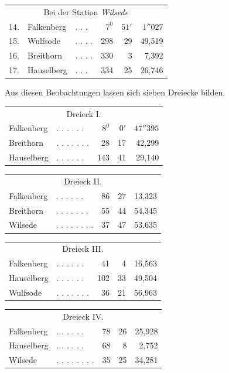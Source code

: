 \begin{center}
\begin{tabular}{r l l r r r}
\multicolumn{6}{c}{Bei der Station \textit{Wilsede}}\\[5pt]
14.&Falkenberg&. . .&\(7^0\)&\(51'\)&\(1''027\)\\
15.&Wulfsode&. . . .&298&29&49,519\\
16.&Breithorn&. . . .&330&3&7,392\\
17.&Hauselberg&. . .&334&25&26,746
\end{tabular}
\end{center}

Aus diesen Beobachtungen lassen sich sieben Dreiecke bilden.
\begin{center}
\begin{tabular}{l l r r r}
\multicolumn{5}{c}{Dreieck I.}\\[5pt]
Falkenberg&. . . . . .&\(8^0\)&\(0'\)&\(47''395\)\\
Breithorn&. . . . . . .&28&17&42,299\\
Hauselberg&. . . . . .&143&41&29,140
\end{tabular}
\end{center}
\begin{center}
\begin{tabular}{l l r r r}
\multicolumn{5}{c}{Dreieck II.}\\[5pt]
Falkenberg&. . . . . .&86&27&13,323\\
Breithorn&. . . . . . .&55&44&54,345\\
Wilsede&. . . . . . . .&37&47&53.635
\end{tabular}
\end{center}
\begin{center}
\begin{tabular}{l l r r r}
\multicolumn{5}{c}{Dreieck III.}\\[5pt]
Falkenberg&. . . . . .&41&4&16,563\\
Hauselberg&. . . . . .&102&33&49,504\\
Wulfsode&. . . . . . .&36&21&56,963
\end{tabular}
\end{center}
\begin{center}
\begin{tabular}{l l r r r}
\multicolumn{5}{c}{Dreieck IV.}\\[5pt]
Falkenberg&. . . . . .&78&26&25,928\\
Hauselberg&. . . . . .&68&8&2,752\\
Wilsede&. . . . . . . .&35&25&34,281
\end{tabular}
\end{center}
